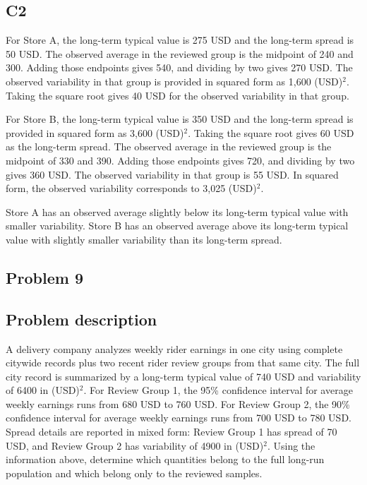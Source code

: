 \begin{ExamProblems}
\subsection*{C2}
		For Store A, the long-term typical value is 275 USD and the long-term spread is 50 USD.
		The observed average in the reviewed group is the midpoint of 240 and 300.
		Adding those endpoints gives 540, and dividing by two gives 270 USD.
		The observed variability in that group is provided in squared form as 1,600 (USD)$^2$.
		Taking the square root gives 40 USD for the observed variability in that group.

		For Store B, the long-term typical value is 350 USD and the long-term spread is provided in squared form as 3,600 (USD)$^2$.
		Taking the square root gives 60 USD as the long-term spread.
		The observed average in the reviewed group is the midpoint of 330 and 390.
		Adding those endpoints gives 720, and dividing by two gives 360 USD.
		The observed variability in that group is 55 USD.
		In squared form, the observed variability corresponds to 3,025 (USD)$^2$.

		Store A has an observed average slightly below its long-term typical value with smaller variability.
		Store B has an observed average above its long-term typical value with slightly smaller variability than its long-term spread.


		\newpage
		\item
		\subsection*{Problem 9}
		\subsection*{Problem description}
		A delivery company analyzes weekly rider earnings in one city using complete citywide records plus two recent rider review groups from that same city.
		The full city record is summarized by a long-term typical value of 740 USD and variability of 6400 in (USD)$^2$.
		For Review Group 1, the 95\% confidence interval for average weekly earnings runs from 680 USD to 760 USD.
		For Review Group 2, the 90\% confidence interval for average weekly earnings runs from 700 USD to 780 USD.
		Spread details are reported in mixed form: Review Group 1 has spread of 70 USD, and Review Group 2 has variability of 4900 in (USD)$^2$.
		Using the information above, determine which quantities belong to the full long-run population and which belong only to the reviewed samples.


\end{ExamProblems}
